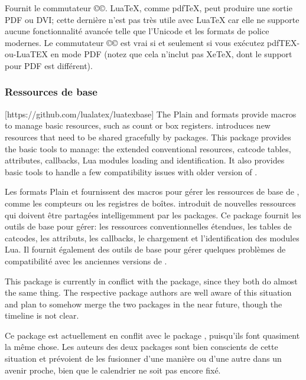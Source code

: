 \documentclass{lltxdoc}
\begin{document}
Fournit le commutateur ©\ifpdf©. LuaTeX, comme pdfTeX, peut produire une sortie PDF ou DVI; cette dernière n'est pas très utile avec LuaTeX car elle ne supporte aucune fonctionnalité avancée telle que l'Unicode et les formats de police modernes. Le commutateur ©\ifpdf© est vrai si et seulement si vous exécutez pdfTEX-ou-LuaTEX en mode PDF (notez que cela n'inclut pas XeTeX, dont le support pour PDF est différent).

\subsubsection{Ressources de base}

[https://github.com/lualatex/luatexbase]
The Plain and \latex formats provide macros to manage \tex basic resources,
such as count or box registers. \luatex introduces new resources that need to
be shared gracefully by packages. This package provides the basic tools to
manage: the extended conventional \tex resources, catcode tables, attributes,
callbacks, Lua modules loading and identification. It also provides basic
tools to handle a few compatibility issues with older version of \luatex.

Les formats Plain et \latex fournissent des macros pour gérer les ressources de base de \tex, comme les compteurs ou les registres de boîtes. \luatex introduit de nouvelles ressources qui doivent être partagées intelligemment par les packages. Ce package fournit les outils de base pour gérer: les ressources \tex conventionnelles étendues, les tables de catcodes, les attributs, les callbacks, le chargement et l'identification des modules Lua. Il fournit également des outils de base pour gérer quelques problèmes de compatibilité avec les anciennes versions de \luatex.

 This package is currently in conflict with the 
package, since they both do almost the same thing. The respective package
authors are well aware of this situation and plan to somehow merge the two
packages in the near future, though the timeline is not clear.

 Ce package est actuellement en conflit avec le package , puisqu'ils font quasiment la même chose. Les auteurs des deux packages sont bien conscients de cette situation et prévoient de les fusionner d'une manière ou d'une autre dans un avenir proche, bien que le calendrier ne soit pas encore fixé.
\end{document}
